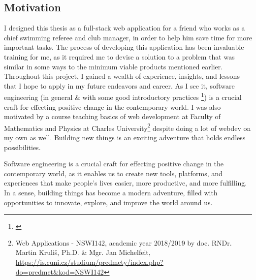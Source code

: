 \subsection*{Motivation}
\par
I designed this thesis as a full-stack web application for a friend who works as a chief swimming referee and club manager, in order to help him save time for more important tasks. The process of developing this application has been invaluable training for me, as it required me to devise a solution to a problem that was similar in some ways to the minimum viable products mentioned earlier. Throughout this project, I gained a wealth of experience, insights, and lessons that I hope to apply in my future endeavors and career. As I see it, software engineering (in general \& with some good introductory practices \footnote{\cite{MNSWE}}) is a crucial craft for effecting positive change in the contemporary world. I was also motivated by a course teaching basics of web development at Faculty of Mathematics and Physics at Charles University\footnote{Web Applications - NSWI142, academic year 2018/2019 by doc. RNDr. Martin Kruliš, Ph.D. \& Mgr. Jan Michelfeit, \url{https://is.cuni.cz/studium/predmety/index.php?do=predmet&kod=NSWI142}} despite doing a lot of webdev on my own as well. Building new things is an exciting adventure that holds endless possibilities.
\par
Software engineering is a crucial craft for effecting positive change in the contemporary world, as it enables us to create new tools, platforms, and experiences that make people's lives easier, more productive, and more fulfilling. In a sense, building things has become a modern adventure, filled with opportunities to innovate, explore, and improve the world around us.